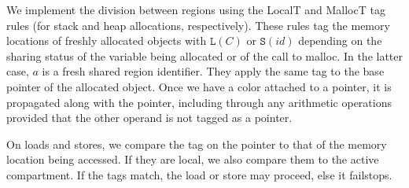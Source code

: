 We implement the division between regions using the LocalT and MallocT tag rules
(for stack and heap allocations, respectively). These rules tag the memory locations
of freshly allocated objects with \(\mathtt{L}(C)\) or \(\mathtt{S}(id)\) depending
on the sharing status of the variable being allocated or of the call to malloc.
In the latter case, \(a\) is a fresh shared region identifier.
They apply the same tag to the base pointer of the allocated object.
Once we have a color attached to a pointer, it is propagated along
with the pointer, including through any arithmetic operations provided that the other operand
is not tagged as a pointer.

On loads and stores, we compare the tag on the pointer to that of the memory location
being accessed. If they are local, we also compare them to the active compartment.
If the tags match, the load or store may proceed, else it failstops.

